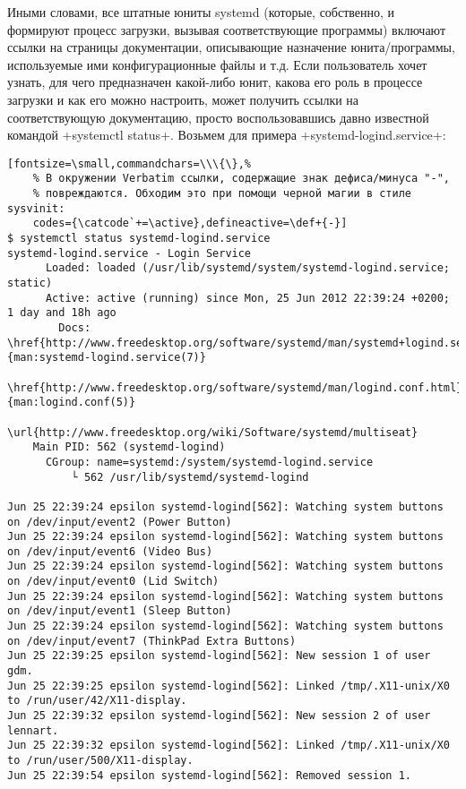 \documentclass[10pt,oneside,a4paper]{article}
\begin{document}
Иными словами, все штатные юниты systemd (которые, собственно, и формируют
процесс загрузки, вызывая соответствующие программы) включают ссылки на страницы
документации, описывающие назначение юнита/программы, используемые ими
конфигурационные файлы и т.д. Если пользователь хочет узнать, для чего
предназначен какой-либо юнит, какова его роль в процессе загрузки и как его
можно настроить, может получить ссылки на соответствующую документацию, просто
воспользовавшись давно известной командой +systemctl status+. Возьмем для
примера +systemd-logind.service+:
\begin{Verbatim}[fontsize=\small,commandchars=\\\{\},%
	% В окружении Verbatim ссылки, содержащие знак дефиса/минуса "-",
	% повреждаются. Обходим это при помощи черной магии в стиле sysvinit:
	codes={\catcode`+=\active},defineactive=\def+{-}]
$ systemctl status systemd-logind.service
systemd-logind.service - Login Service
	  Loaded: loaded (/usr/lib/systemd/system/systemd-logind.service; static)
	  Active: active (running) since Mon, 25 Jun 2012 22:39:24 +0200; 1 day and 18h ago
	    Docs: \href{http://www.freedesktop.org/software/systemd/man/systemd+logind.service.html}{man:systemd-logind.service(7)}
	          \href{http://www.freedesktop.org/software/systemd/man/logind.conf.html}{man:logind.conf(5)}
	          \url{http://www.freedesktop.org/wiki/Software/systemd/multiseat}
	Main PID: 562 (systemd-logind)
	  CGroup: name=systemd:/system/systemd-logind.service
		  └ 562 /usr/lib/systemd/systemd-logind

Jun 25 22:39:24 epsilon systemd-logind[562]: Watching system buttons on /dev/input/event2 (Power Button)
Jun 25 22:39:24 epsilon systemd-logind[562]: Watching system buttons on /dev/input/event6 (Video Bus)
Jun 25 22:39:24 epsilon systemd-logind[562]: Watching system buttons on /dev/input/event0 (Lid Switch)
Jun 25 22:39:24 epsilon systemd-logind[562]: Watching system buttons on /dev/input/event1 (Sleep Button)
Jun 25 22:39:24 epsilon systemd-logind[562]: Watching system buttons on /dev/input/event7 (ThinkPad Extra Buttons)
Jun 25 22:39:25 epsilon systemd-logind[562]: New session 1 of user gdm.
Jun 25 22:39:25 epsilon systemd-logind[562]: Linked /tmp/.X11-unix/X0 to /run/user/42/X11-display.
Jun 25 22:39:32 epsilon systemd-logind[562]: New session 2 of user lennart.
Jun 25 22:39:32 epsilon systemd-logind[562]: Linked /tmp/.X11-unix/X0 to /run/user/500/X11-display.
Jun 25 22:39:54 epsilon systemd-logind[562]: Removed session 1.
\end{Verbatim}
\end{document}
